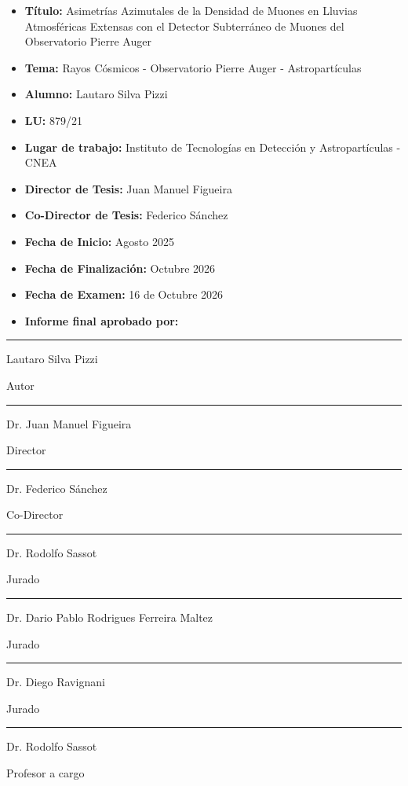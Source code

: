 \documentclass[spanish,a4paper,12pt]{book}
\newcommand{\juradoUno}{Dr. Rodolfo Sassot}
\newcommand{\juradoDos}{Dr. Dario Pablo Rodrigues Ferreira Maltez}
\newcommand{\juradoTres}{Dr. Diego Ravignani}
\newcommand{\profesorTesis}{Dr. Rodolfo Sassot}
\newcommand{\firmatesis}[2]{%
	\begin{minipage}[t]{0.30\textwidth}
		\centering
		\rule{\linewidth}{0.4pt}\par
		\vspace{0.15cm}
		{\small #1\par}
		\vspace{0.08cm}
		{\small #2\par}
	\end{minipage}%
}
\begin{document}
	\newpage
	\thispagestyle{empty}
	\vspace{0.5cm}
	\begin{center}
		
		\begin{itemize}
			\item \textbf{Título:} Asimetrías Azimutales de la Densidad de Muones en Lluvias Atmosféricas Extensas con el Detector Subterráneo de Muones del Observatorio Pierre Auger
			\vspace{0.2cm}
			\item \textbf{Tema:} Rayos Cósmicos - Observatorio Pierre Auger - Astropartículas
			\vspace{0.2cm}
			\item \textbf{Alumno:} Lautaro Silva Pizzi
			\vspace{0.2cm}
			\item \textbf{LU:} 879/21
			\vspace{0.2cm}
			\item \textbf{Lugar de trabajo:} Instituto de Tecnologías en Detección y Astropartículas - CNEA
			\vspace{0.2cm}
			\item \textbf{Director de Tesis:} Juan Manuel Figueira
			\vspace{0.2cm}
			\item \textbf{Co-Director de Tesis:} Federico Sánchez
			\vspace{0.2cm}      
			\item \textbf{Fecha de Inicio:} Agosto 2025
			\vspace{0.2cm}
			\item \textbf{Fecha de Finalización:} Octubre 2026
			\vspace{0.2cm}
			\item \textbf{Fecha de Examen:} 16 de Octubre 2026 
			\vspace{0.2cm}
			\item \textbf{Informe final aprobado por:}
		\end{itemize}  
		
		\vspace{0.8cm}
		\noindent
		\firmatesis{Lautaro Silva Pizzi}{Autor}\hfill
		\firmatesis{Dr. Juan Manuel Figueira}{Director}\hfill
		\firmatesis{Dr. Federico Sánchez}{Co-Director}
		
		\par\vspace{1.1cm}
		\noindent
		\firmatesis{\juradoUno}{Jurado}\hfill
		\firmatesis{\juradoDos}{Jurado}\hfill
		\firmatesis{\juradoTres}{Jurado}
		
		\par\vspace{1.1cm}
		\firmatesis{\profesorTesis}{Profesor a cargo}
		
	\end{center}
	\noindent 
	
\end{document}
